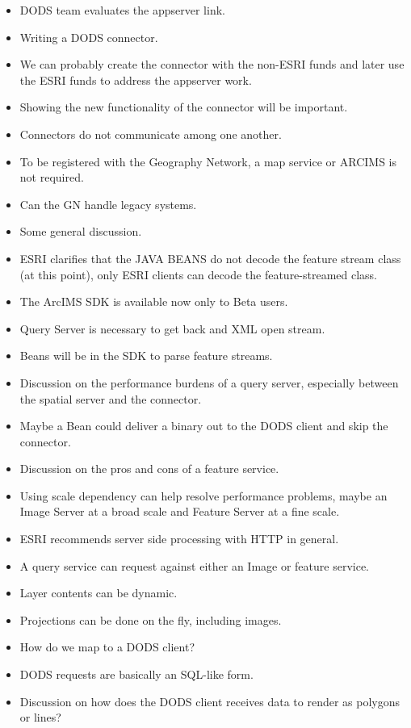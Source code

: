 \begin{itemize}
\item DODS team evaluates the appserver link.
\item Writing a DODS connector.
\item We can probably create the connector with the non-ESRI funds and later use the ESRI 
funds to address the appserver work.
\item Showing the new functionality of the connector will be important.
\item Connectors do not communicate among one another.
\item To be registered with the Geography Network, a map service or ARCIMS is not required.
\item Can the GN handle legacy systems.
\item Some general discussion.
\item ESRI clarifies that the JAVA BEANS do not decode the feature stream class (at this 
point), only ESRI clients can decode the feature-streamed class.
\item The ArcIMS SDK is available now only to Beta users.
\item Query Server is necessary to get back and XML open stream.
\item Beans will be in the SDK to parse feature streams.
\item Discussion on the performance burdens of a query server, especially between the spatial 
server and the connector.
\item Maybe a Bean could deliver a binary out to the DODS client and skip the connector.
\item Discussion on the pros and cons of a feature service.
\item Using scale dependency can help resolve performance problems, maybe an Image Server 
at a broad scale and Feature Server at a fine scale.
\item ESRI recommends server side processing with HTTP in general.
\item A query service can request against either an Image or feature service.
\item Layer contents can be dynamic.
\item Projections can be done on the fly, including images.
\item How do we map to a DODS client?
\item DODS requests are basically an SQL-like form.
\item Discussion on how does the DODS client receives data to render as polygons or lines?

\end{itemize}
